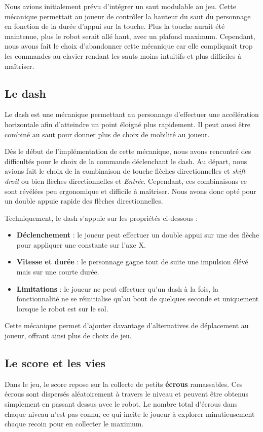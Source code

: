 \documentclass[10pt]{report}
\begin{document}
Nous avions initialement prévu d'intégrer un saut modulable au jeu. Cette mécanique permettait au joueur de contrôler la hauteur du saut du personnage en fonction de la durée d'appui sur la touche. Plus la touche aurait été maintenue, plus le robot serait allé haut, avec un plafond maximum.
Cependant, nous avons fait le choix d'abandonner cette mécanique car elle compliquait trop les commandes au clavier rendant les sauts moins intuitifs et plus difficiles à maîtriser. 

\subsection{Le dash}
Le dash est une mécanique permettant au personnage d'effectuer une accélération horizontale afin d'atteindre un point éloigné plus rapidement. Il peut aussi être combiné au saut pour donner plus de choix de mobilité au joueur.

Dès le début de l'implémentation de cette mécanique, nous avons rencontré des difficultés pour le choix de la commande déclenchant le dash. Au départ, nous avions fait le choix de la combinaison de touche flèches directionnelles et \emph{shift droit} ou bien flèches directionnelles et \emph{Entrée}. Cependant, ces combinaisons ce sont révélées peu ergonomique et difficile à maîtriser. Nous avons donc opté pour un double appuie rapide des flèches directionnelles.

Techniquement, le dash s'appuie sur les propriétés ci-dessous :
\begin{itemize}
  \item \textbf{Déclenchement} : le joueur peut effectuer un double appui sur une des flèche pour appliquer une constante sur l'axe X.
  \item \textbf{Vitesse et durée} : le personnage gagne tout de suite une impulsion élévé mais sur une courte durée.
  \item \textbf{Limitations} : le joueur ne peut effectuer qu'un dash à la fois, la fonctionnalité ne se réinitialise qu'au bout de quelques seconde et uniquement lorsque le robot est sur le sol. 
\end{itemize}

Cette mécanique permet d'ajouter davantage d'alternatives de déplacement au joueur, offrant ainsi plus de choix de jeu. 

\subsection{Le score et les vies}
Dans le jeu, le score repose sur la collecte de petits \textbf{écrous} ramassables. Ces écrous sont dispersés aléatoirement à travers le niveau et peuvent être obtenus simplement en passant dessus avec le robot. Le nombre total d'écrous dans chaque niveau n'est pas connu, ce qui incite le joueur à explorer minutieusement chaque recoin pour en collecter le maximum.
\end{document}
